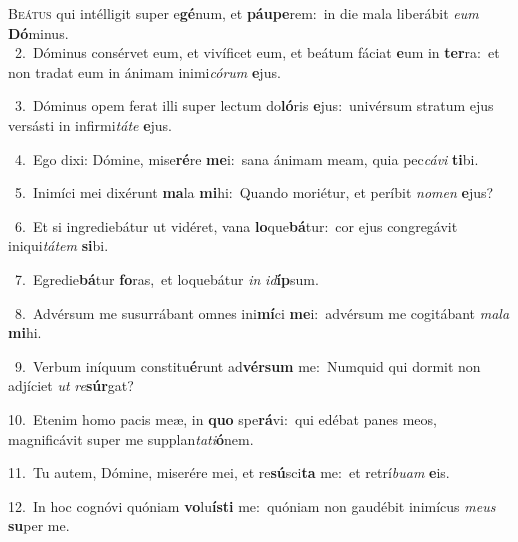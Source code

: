 \lettrine{\initial\textcolor{\initialcolor}{B}}{eátus} qui intélligit super e\-\textbf{gé}\-num, et \textbf{páu}\-\textbf{pe}rem:~\star in die mala liberábit \textit{e}\-\textit{um} \textbf{Dó}\-minus.\\
{\numbfont\textcolor{\numbcolor}{~2.}}~Dóminus consérvet eum, et vivíficet eum, et beátum fáciat \textbf{e}\-um in \textbf{ter}\-ra:~\star et non tradat eum in ánimam inimi\-\textit{có}\-\textit{rum} \textbf{e}\-jus.\par
{\numbfont\textcolor{\numbcolor}{~3.}}~Dóminus opem ferat illi super lectum do\-\textbf{ló}\-ris \textbf{e}\-jus:~\star univérsum stratum ejus versásti in infirmi\-\textit{tá}\-\textit{te} \textbf{e}\-jus.\par
{\numbfont\textcolor{\numbcolor}{~4.}}~Ego dixi: Dómine, mise\-\textbf{ré}\-re \textbf{me}\-i:~\star sana ánimam meam, quia pec\-\textit{cá}\-\textit{vi} \textbf{ti}\-bi.\par
{\numbfont\textcolor{\numbcolor}{~5.}}~Inimíci mei dixérunt \textbf{ma}\-la \textbf{mi}\-hi:~\star Quando moriétur, et períbit \textit{no}\-\textit{men} \textbf{e}\-jus?\par
{\numbfont\textcolor{\numbcolor}{~6.}}~Et si ingrediebátur ut vidéret, vana \textbf{lo}\-que\-\textbf{bá}\-tur:~\star cor ejus congregávit iniqui\-\textit{tá}\-\textit{tem} \textbf{si}\-bi.\par
{\numbfont\textcolor{\numbcolor}{~7.}}~Egredie\-\textbf{bá}\-tur \textbf{fo}\-ras,~\star et loquebátur \textit{in} \textit{id}\-\textbf{íp}sum.\par
{\numbfont\textcolor{\numbcolor}{~8.}}~Advérsum me susurrábant omnes ini\-\textbf{mí}\-ci \textbf{me}\-i:~\star advérsum me cogitábant \textit{ma}\-\textit{la} \textbf{mi}\-hi.\par
{\numbfont\textcolor{\numbcolor}{~9.}}~Verbum iníquum constitu\-\textbf{é}\-runt ad\-\textbf{vér}\-\textbf{sum} me:~\star Numquid qui dormit non adjíciet \textit{ut} \textit{re}\-\textbf{súr}gat?\par
{\numbfont\textcolor{\numbcolor}{10.}}~Etenim homo pacis meæ, in \textbf{quo} spe\-\textbf{rá}\-vi:~\star qui edébat panes meos, magnificávit super me supplan\-\textit{ta}\-\textit{ti}\textbf{ó}nem.\par
{\numbfont\textcolor{\numbcolor}{11.}}~Tu autem, Dómine, miserére mei, et re\-\textbf{sú}\-sci\textbf{ta} me:~\star et retrí\-\textit{bu}\-\textit{am} \textbf{e}\-is.\par
{\numbfont\textcolor{\numbcolor}{12.}}~In hoc cognóvi quóniam \textbf{vo}\-lu\-\textbf{ís}\-\textbf{ti} me:~\star quóniam non gaudébit inimícus \textit{me}\-\textit{us} \textbf{su}\-per me.\par

